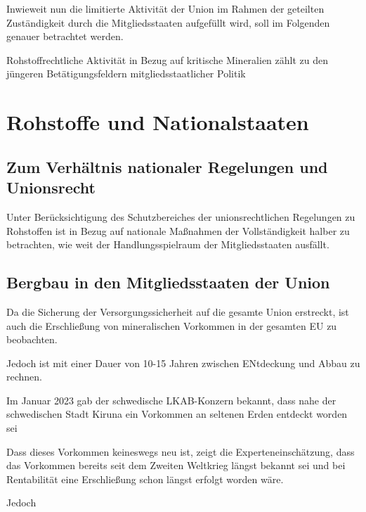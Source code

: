 \documentclass[12pt,a4paper,oneside]{book} %
\begin{document}
Inwieweit nun die limitierte Aktivität der Union im Rahmen der geteilten Zuständigkeit durch die Mitgliedsstaaten aufgefüllt wird, soll im Folgenden genauer betrachtet
werden.

Rohstoffrechtliche Aktivität in Bezug auf kritische Mineralien zählt zu den jüngeren Betätigungsfeldern mitgliedsstaatlicher Politik




\section{Rohstoffe und Nationalstaaten}



\subsection{Zum Verhältnis nationaler Regelungen und Unionsrecht}
Unter Berücksichtigung des Schutzbereiches der unionsrechtlichen Regelungen zu Rohstoffen ist in Bezug auf nationale Maßnahmen der Vollständigkeit halber zu betrachten, wie weit der Handlungsspielraum der Mitgliedsstaaten ausfällt.

\subsection{Bergbau in den Mitgliedsstaaten der Union}

Da die Sicherung der Versorgungssicherheit auf die gesamte Union erstreckt, ist auch die Erschließung von mineralischen Vorkommen in der gesamten EU zu beobachten.	

Jedoch ist mit einer Dauer von 10-15 Jahren zwischen ENtdeckung und Abbau zu rechnen.


Im Januar 2023 gab der schwedische LKAB-Konzern bekannt, dass nahe der schwedischen Stadt Kiruna ein Vorkommen an seltenen Erden entdeckt worden sei 

Dass dieses Vorkommen keineswegs neu ist, zeigt die Experteneinschätzung, dass das Vorkommen bereits seit dem Zweiten Weltkrieg längst bekannt sei und bei Rentabilität eine Erschließung schon längst erfolgt worden wäre.\autocite{VDi Nachrichten: Seltene Erden: Deutschland importiert lieber, als selbst zu fördern}


Jedoch 
\end{document}
